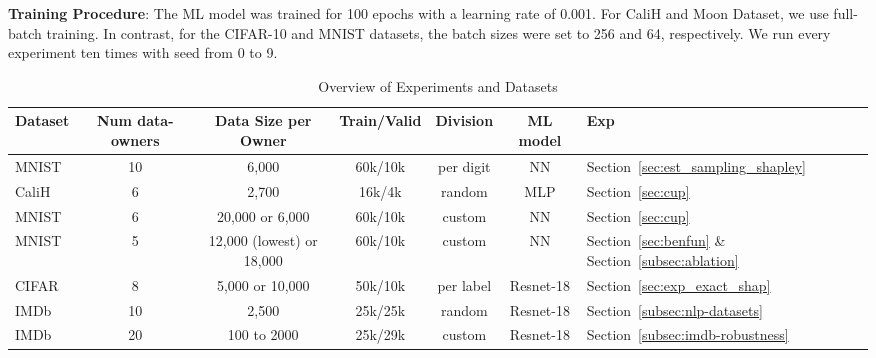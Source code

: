 \textbf{Training Procedure}: The ML model was trained for 100 epochs with a learning rate of 0.001. For CaliH and Moon Dataset, we use full-batch training. In contrast, for the CIFAR-10 and MNIST datasets, the batch sizes were set to 256 and 64, respectively. We run every experiment ten times with seed from 0 to 9.
\begin{table}[h]
\centering
\caption{Overview of Experiments and Datasets}
\label{tab:datasize_per_owner}
\begin{tabular}{|l|c|c|c|c|c|l|}
\hline
\textbf{Dataset} & \textbf{Num data-owners} & \textbf{Data Size per Owner}&  \textbf{Train/Valid} &  \textbf{Division} &  \textbf{ML model} & \textbf{Exp} \\ \hline
MNIST            & 10                             & 6,000                    & 60k/10k& per digit&  NN&   Section~\ref{sec:est_sampling_shapley} \\ \hline
CaliH            & 6                              & 2,700                    & 16k/4k  & random &  MLP& Section~\ref{sec:cup}\\ \hline
MNIST            & 6                             & 20,000 or 6,000            & 60k/10k&  custom &   NN&
Section~\ref{sec:cup}\ \\ \hline
MNIST            & 5                              & 12,000 (lowest) or 18,000    & 60k/10k  & custom &  NN& Section~\ref{sec:benfun} \& Section~\ref{subsec:ablation} \\ \hline
CIFAR            & 8                              & 5,000 or 10,000      & 50k/10k  & per label& Resnet-18 &Section~\ref{sec:exp_exact_shap}\\ \hline
IMDb            & 10                              & 2,500    & 25k/25k  & random& Resnet-18 &Section~\ref{subsec:nlp-datasets}\\ \hline
IMDb            & 20                              & 100 to 2000    & 25k/29k  & custom& Resnet-18 &Section~\ref{subsec:imdb-robustness}\\ \hline
\end{tabular}
\end{table}

